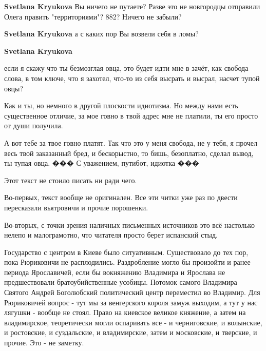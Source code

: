 \begin{itemize}
\begin{itemize}
\textbf{Svetlana Kryukova} Вы ничего не путаете? Разве это не новгородцы отправили Олега править "территориями"? 882? Ничего не забыли?

 
\textbf{Svetlana Kryukova} а с каких пор Вы возвели себя в ломы?

 
\textbf{Svetlana Kryukova} 

если я скажу что ты безмозглая овца, это будет идти мне в зачёт, как свобода
слова, в том ключе, что я захотел, что-то из себя высрать и высрал, насчет
тупой овцы? 

Как и ты, но немного в другой плоскости идиотизма. Но между нами есть
существенное отличие, за мое говно в твой адрес мне не платили, ты его просто
от души получила. 

А вот тебе за твое говно платят. Так что это у меня свобода, не у тебя, я
прочел весь твой заказанный бред, и бескорыстно, то бишь, безоплатно, сделал
вывод, ты тупая овца. ��� С уважением, путибот, идиотка ���

 

Этот текст не стоило писать ни ради чего.

Во-первых, текст вообще не оригинален. Все эти читки уже раз по двести
пересказали вьятровичи и прочие порошенки.

Во-вторых, с точки зрения наличных письменных источников это всё настолько
нелепо и малограмотно, что читателя просто берет испанский стыд.

Государство с центром в Киеве было ситуативным. Существовало до тех пор, пока
Рюриковичи не расплодились. Раздробление могло бы произойти и ранее периода
Ярославичей, если бы вокняжению Владимира и Ярослава не предшествовали
братоубийственные усобицы. Потомок самого Владимира Святого Андрей Боголюбский
политический центр переместил во Владимир. Для Рюриковичей вопрос - тут мы за
венгерского короля замуж выходим, а тут у нас лягушки - вообще не стоял. Право
на киевское великое княжение, а затем на владимирское, теоретически могли
оспаривать все - и черниговские, и волынские, и ростовские, и суздальские, и
владимирские, затем и московские, и тверские, и прочие. Это - не заметку.


\end{itemize}
\end{itemize}
